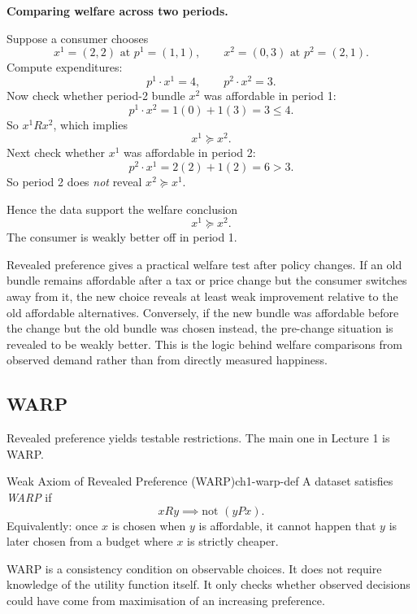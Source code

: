\begin{examplebox}
\textbf{Comparing welfare across two periods.}

Suppose a consumer chooses
\[
x^1=(2,2) \text{ at } p^1=(1,1),
\qquad
x^2=(0,3) \text{ at } p^2=(2,1).
\]
Compute expenditures:
\[
p^1 \cdot x^1 = 4,
\qquad
p^2 \cdot x^2 = 3.
\]
Now check whether period-2 bundle $x^2$ was affordable in period 1:
\[
p^1 \cdot x^2 = 1(0)+1(3)=3 \le 4.
\]
So $x^1 R x^2$, which implies
\[
x^1 \succeq x^2.
\]
Next check whether $x^1$ was affordable in period 2:
\[
p^2 \cdot x^1 = 2(2)+1(2)=6 > 3.
\]
So period 2 does \emph{not} reveal $x^2 \succeq x^1$.

Hence the data support the welfare conclusion
\[
\boxed{x^1 \succeq x^2.}
\]
The consumer is weakly better off in period 1.
\end{examplebox}

\begin{policynote}
Revealed preference gives a practical welfare test after policy changes. If an old bundle remains affordable after a tax or price change but the consumer switches away from it, the new choice reveals at least weak improvement relative to the old affordable alternatives. Conversely, if the new bundle was affordable before the change but the old bundle was chosen instead, the pre-change situation is revealed to be weakly better. This is the logic behind welfare comparisons from observed demand rather than from directly measured happiness.
\end{policynote}

\subsection{WARP}

Revealed preference yields testable restrictions. The main one in Lecture 1 is WARP.

\begin{definition}{Weak Axiom of Revealed Preference (WARP)}{ch1-warp-def}
A dataset satisfies \emph{WARP} if
\[
x R y \implies \text{not } (y P x).
\]
Equivalently: once $x$ is chosen when $y$ is affordable, it cannot happen that $y$ is later chosen from a budget where $x$ is strictly cheaper.
\end{definition}

WARP is a consistency condition on observable choices. It does not require knowledge of the utility function itself. It only checks whether observed decisions could have come from maximisation of an increasing preference.

